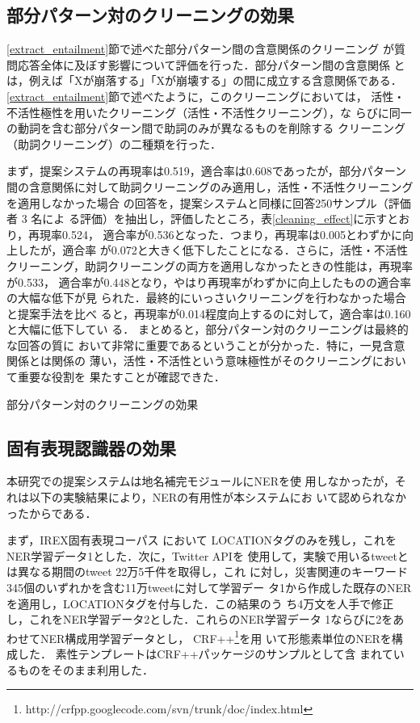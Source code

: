 \documentclass[japanese]{jnlp_1.4}
\begin{document}
\subsection{部分パターン対のクリーニングの効果}

\ref{extract_entailment}節で述べた部分パターン間の含意関係のクリーニング
が質問応答全体に及ぼす影響について評価を行った．部分パターン間の含意関係
とは，例えば「Xが崩落する」「Xが崩壊する」の間に成立する含意関係である．
\ref{extract_entailment}節で述べたように，このクリーニングにおいては，
活性・不活性極性を用いたクリーニング（活性・不活性クリーニング），な
らびに同一の動詞を含む部分パターン間で助詞のみが異なるものを削除する
クリーニング（助詞クリーニング）の二種類を行った．

まず，提案システムの再現率は0.519，適合率は0.608であったが，部分パターン
間の含意関係に対して助詞クリーニングのみ適用し，活性・不活性クリーニングを適用しなかった場合
の回答を，提案システムと同様に回答250サンプル（評価者 3 名によ
る評価）を抽出し，評価したところ，表\ref{cleaning_effect}に示すとおり，再現率0.524，
適合率が0.536となった．つまり，再現率は0.005とわずかに向上したが，適合率
が0.072と大きく低下したことになる．さらに，活性・不活性クリーニング，助詞クリーニングの両方を適用しなかったときの性能は，再現率が0.533，
適合率が0.448となり，やはり再現率がわずかに向上したものの適合率の大幅な低下が見
られた．最終的にいっさいクリーニングを行わなかった場合と提案手法を比べ
ると，再現率が0.014程度向上するのに対して，適合率は0.160と大幅に低下してい
る．
まとめると，部分パターン対のクリーニングは最終的な回答の質に
おいて非常に重要であるということが分かった．特に，一見含意関係とは関係の
薄い，活性・不活性という意味極性がそのクリーニングにおいて重要な役割を
果たすことが確認できた．

\begin{table}[b]
\caption{部分パターン対のクリーニングの効果}
\label{cleaning_effect}

\end{table}


\subsection{固有表現認識器の効果}

本研究での提案システムは地名補完モジュールにNERを使
用しなかったが，それは以下の実験結果により，NERの有用性が本システムにお
いて認められなかったからである．

まず，IREX固有表現コーパス \cite{Sekine2000}において
LOCATIONタグのみを残し，これをNER学習データ1とした．次に，Twitter APIを
使用して，実験で用いるtweetとは異なる期間のtweet 22万5千件を取得し，これ
に対し，災害関連のキーワード345個のいずれかを含む11万tweetに対して学習デー
タ1から作成した既存のNERを適用し，LOCATIONタグを付与した．この結果のう
ち4万文を人手で修正し，これをNER学習データ2とした．これらのNER学習データ
1ならびに2をあわせてNER構成用学習データとし，
CRF++\footnote{http://crfpp.googlecode.com/svn/trunk/doc/index.html}を用
いて形態素単位のNERを構成した．
素性テンプレートはCRF++パッケージのサンプルとして含
まれているものをそのまま利用した．
\end{document}
